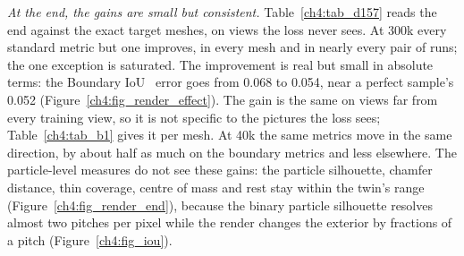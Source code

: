 \textit{At the end, the gains are small but consistent.} Table~\ref{ch4:tab_d157} reads the end against the exact target
meshes, on views the loss never sees. At 300k every standard metric but one improves, in every mesh and in nearly every
pair of runs; the one exception is saturated. The improvement is real but small in absolute terms: the Boundary IoU~\citep{cheng2021boundaryiou} error
goes from 0.068 to 0.054, near a perfect sample's 0.052 (Figure~\ref{ch4:fig_render_effect}). The gain is the same on views far from every training view, so it
is not specific to the pictures the loss sees; Table~\ref{ch4:tab_b1} gives it per mesh. At 40k the same metrics move in
the same direction, by about half as much on the boundary metrics and less elsewhere. The particle-level measures do not
see these gains: the particle silhouette, chamfer distance, thin coverage, centre of mass and rest stay within the twin's
range (Figure~\ref{ch4:fig_render_end}), because the binary particle silhouette resolves almost two pitches per pixel while
the render changes the exterior by fractions of a pitch (Figure~\ref{ch4:fig_iou}).

